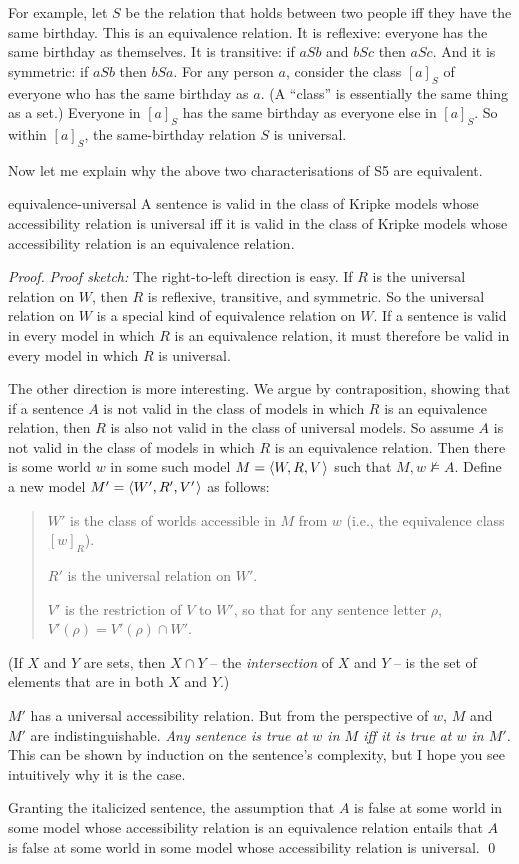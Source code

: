 For example, let $S$ be the relation that holds between two people iff they have
the same birthday. This is an equivalence relation. It is reflexive: everyone
has the same birthday as themselves. It is transitive: if $aSb$ and $bSc$ then
$aSc$. And it is symmetric: if $aSb$ then $bSa$. For any person $a$, consider
the class $[a]_S$ of everyone who has the same birthday as $a$. (A ``class'' is
essentially the same thing as a set.) Everyone in $[a]_S$ has the same birthday
as everyone else in $[a]_S$. So within $[a]_S$, the same-birthday relation $S$
is universal.

Now let me explain why the above two characterisations of S5 are equivalent.

\begin{observation}{equivalence-universal}
  A sentence is valid in the class of Kripke models whose accessibility relation
  is universal iff it is valid in the class of Kripke models whose accessibility
  relation is an equivalence relation.
\end{observation}
%
\begin{proof}
  \emph{Proof sketch:} The right-to-left direction is easy. If $R$ is the universal
  relation on $W$, then $R$ is reflexive, transitive, and symmetric. So the
  universal relation on $W$ is a special kind of equivalence relation on $W$. If
  a sentence is valid in every model in which $R$ is an equivalence relation, it
  must therefore be valid in every model in which $R$ is universal.

  The other direction is more interesting. We argue by contraposition, showing
  that if a sentence $A$ is not valid in the class of models in which $R$ is an
  equivalence relation, then $R$ is also not valid in the class of universal
  models. So assume $A$ is not valid in the class of models in which $R$ is an
  equivalence relation. Then there is some world $w$ in some such model
  $M = \t{W,R,V}$ such that $M,w \not\models A$. Define a new model
  $M' = \t{W',R',V'}$ as follows:
  \begin{quote}
    $W'$ is the class of worlds accessible in $M$ from $w$ (i.e., the
    equivalence class $[w]_R$).

    $R'$ is the universal relation on $W'$.

    $V'$ is the restriction of $V$ to $W'$, so that for any sentence letter $\rho$,
    $V'(\rho) = V'(\rho) \cap W'$.
  \end{quote}
  (If $X$ and $Y$ are sets, then $X \cap Y$ -- the \emph{intersection} of $X$ and
  $Y$ -- is the set of elements that are in both $X$ and $Y$.)

  $M'$ has a universal accessibility relation. But from the perspective of $w$,
  $M$ and $M'$ are indistinguishable. \emph{Any sentence is true at $w$ in $M$
    iff it is true at $w$ in $M'$.} This can be shown by induction on the
  sentence's complexity, but I hope you see intuitively why it is the case.

  Granting the italicized sentence, the assumption that $A$ is false at some
  world in some model whose accessibility relation is an equivalence relation
  entails that $A$ is false at some world in some model whose accessibility
  relation is universal. \qed
\end{proof}

